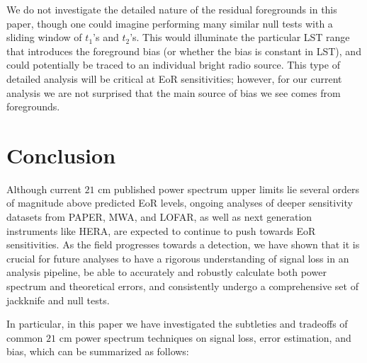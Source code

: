 \documentclass[preprint2,numberedappendix,tighten]{aastex6}  %
\begin{document}
We do not investigate the detailed nature of the residual foregrounds in this paper, though one could imagine performing many 
similar null tests with a sliding window of $t_{1}$'s and $t_{2}$'s. This would illuminate the particular LST range that introduces 
the foreground bias (or whether the bias is constant in LST), and could potentially be traced to an individual bright radio source. 
This type of detailed analysis will be critical at EoR sensitivities; however, for our current analysis we are not surprised that the main source of
bias we see comes from foregrounds. %


\section{Conclusion}
\label{sec:Con}

Although current $21$ cm published power spectrum upper limits lie several orders of magnitude above predicted EoR levels, 
ongoing analyses of deeper sensitivity datasets from PAPER, MWA, and LOFAR, as well as next generation instruments like 
HERA, are expected to continue to push towards EoR sensitivities. As the field progresses towards a detection, we have shown 
that it is crucial for future analyses to have a rigorous understanding of signal loss in an analysis pipeline, be able to accurately 
and robustly calculate both power spectrum and theoretical errors, and consistently undergo a comprehensive set of jackknife 
and null tests.

In particular, in this paper we have investigated the subtleties and tradeoffs of common $21$ cm power spectrum techniques on 
signal loss, error estimation, and bias, which can be summarized as follows:
\end{document}
